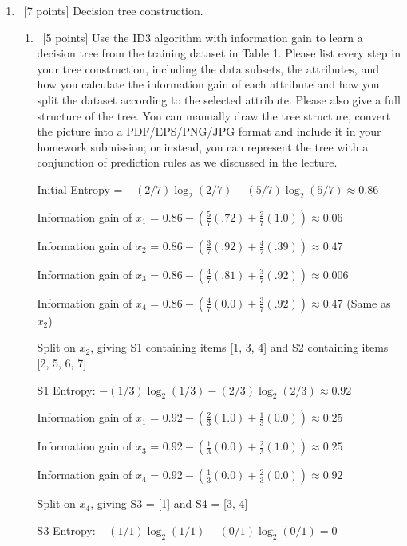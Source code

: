 \documentclass[12pt, fullpage,letterpaper]{article}
\begin{document}
\begin{enumerate}
\item~[7 points] Decision tree construction. 
\begin{enumerate}
\item~[5 points] Use the ID3 algorithm with information gain to learn a decision tree from the training dataset in Table 1. Please list every step in your tree construction, including the data subsets, the attributes, and how you calculate the information gain of each attribute and how you split the dataset according to the selected attribute. Please also give a full structure of the tree. You can manually  draw the tree structure,  convert the picture into a PDF/EPS/PNG/JPG format and include it in your homework submission; or instead, you can  represent the tree with a conjunction of prediction rules as we discussed in the lecture. 

\begin{framed}
	  \newline
	Initial Entropy = $-(2/7)\log_2(2/7)-(5/7)\log_2(5/7) \approx 0.86 $
	
	Information gain of $x_1$ = $0.86 - (\frac{5}{7}(.72) + \frac{2}{7}(1.0)) \approx 0.06 $
	
	Information gain of $x_2$ = $0.86 - (\frac{3}{7}(.92) + \frac{4}{7}(.39)) \approx 0.47 $
	
	Information gain of $x_3$ = $0.86 - (\frac{4}{7}(.81) + \frac{3}{7}(.92)) \approx 0.006 $
	
	Information gain of $x_4$ = $0.86 - (\frac{4}{7}(0.0) + \frac{3}{7}(.92)) \approx 0.47 $ (Same as $x_2$)
	
	Split on $x_2$, giving S1 containing items [1, 3, 4] and S2 containing items [2, 5, 6, 7]
	
	\bigskip
	
	S1 Entropy: $-(1/3)\log_2(1/3)-(2/3)\log_2(2/3) \approx 0.92 $
	
	Information gain of $x_1$ = $0.92 - (\frac{2}{3}(1.0) + \frac{1}{3}(0.0)) \approx 0.25 $
	
	Information gain of $x_3$ = $0.92 - (\frac{1}{3}(0.0) + \frac{2}{3}(1.0)) \approx 0.25 $
	
	Information gain of $x_4$ = $0.92 - (\frac{1}{3}(0.0) + \frac{2}{3}(0.0)) \approx 0.92 $
	
	Split on $x_4$, giving S3 = [1] and S4 = [3, 4]
	
	\bigskip
	
	S3 Entropy: $-(1/1)\log_2(1/1)-(0/1)\log_2(0/1) = 0 $
	

\end{framed}
\end{enumerate}
\end{enumerate}
\end{document}
